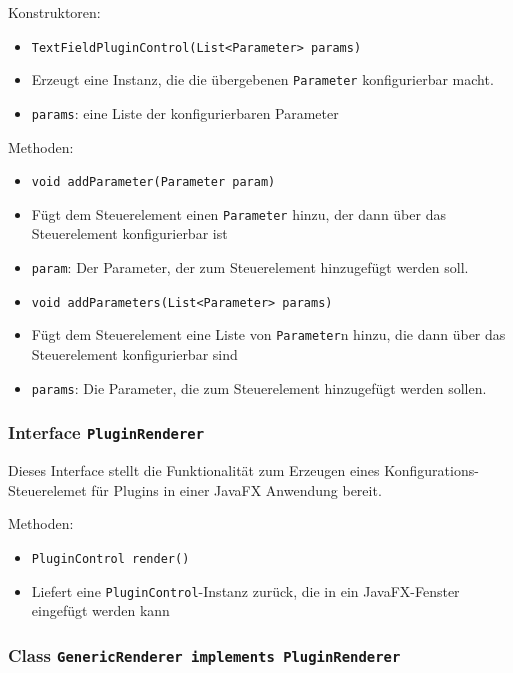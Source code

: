 \documentclass[parskip=full,11pt]{scrartcl}
\begin{document}
Konstruktoren:

\begin{itemize}\itemsep -10pt
	\item \texttt{TextFieldPluginControl(List<Parameter> params)}
	\item[] Erzeugt eine Instanz, die die übergebenen \texttt{Parameter} konfigurierbar macht.
	\item[] \texttt{params}: eine Liste der konfigurierbaren Parameter
\end{itemize}

Methoden:

\begin{itemize}\itemsep -10pt
	\item \texttt{void addParameter(Parameter param)}
	\item[] Fügt dem Steuerelement einen \texttt{Parameter} hinzu, der dann über das Steuerelement konfigurierbar ist
	\item[] \texttt{param}: Der Parameter, der zum Steuerelement hinzugefügt werden soll.
	\item \texttt{void addParameters(List<Parameter> params)}
	\item[] Fügt dem Steuerelement eine Liste von \texttt{Parameter}n hinzu, die dann über das Steuerelement konfigurierbar sind
	\item[] \texttt{params}: Die Parameter, die zum Steuerelement hinzugefügt werden sollen.
\end{itemize}

\subsubsection{Interface \texttt{PluginRenderer}}

Dieses Interface stellt die Funktionalität zum Erzeugen eines Konfigurations-Steuerelemet für Plugins in einer JavaFX Anwendung bereit.

Methoden:

\begin{itemize}\itemsep -10pt
	\item \texttt{PluginControl render()}
	\item[] Liefert eine \texttt{PluginControl}-Instanz zurück, die in ein JavaFX-Fenster eingefügt werden kann
\end{itemize}

\subsubsection{Class \texttt{GenericRenderer implements PluginRenderer}}
\end{document}
